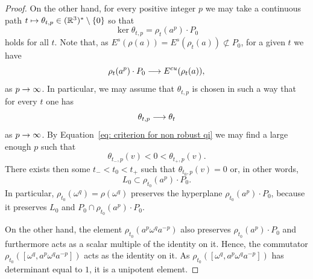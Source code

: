 \documentclass[10pt,a4paper]{amsart}
\newcommand{\R}{\mathbb{R}}
\newcommand{\RR}{\R}
\newcommand{\Es}{E^s}
\newcommand{\Ecu}{E^{cu}}
\renewcommand*{\to}{\mathchoice{\longrightarrow}{\rightarrow}{\rightarrow}{\rightarrow}}
\let\oldmapsto\mapsto
\renewcommand*{\mapsto}{\mathchoice{\longmapsto}{\oldmapsto}{\oldmapsto}{\oldmapsto}}
\let\oldin\in
\renewcommand{\in}{\mathchoice{\oldin}{\oldin}{\,\oldin\,}{\,\oldin\,}}
\numberwithin{equation}{section}
\theoremstyle{definition}\newtheorem{defi}[theo]{Definition}
\begin{document}
\begin{proof}
On the other hand, for every positive integer $p$ we may take a continuous path $t\mapsto\theta_{t,p}\in(\RR^3)^*\setminus\{0\}$ so that
\[
\ker\theta_{t,p}=\rho_t(a^p)\cdot P_0
\]
holds for all $t$.
Note that, as $\Es(\rho(a))=\Es(\rho_t(a))\not\subset P_0$, for a given $t$ we have
\[
\rho_t(a^p)\cdot P_0\to\Ecu(\rho_t(a)),
\]
as $p\to\infty$.
In particular, we may assume that $\theta_{t,p}$ is chosen in such a way that for every $t$ one has
\[
\theta_{t,p}\to\theta_t
\]
as $p\to\infty$.
By Equation~\eqref{eq: criterion for non robust qi} we may find a large enough $p$ such that
\[
\theta_{t_-,p}(v)<0<\theta_{t_+,p}(v).
\]
There exists then some $t_-<t_0<t_+$ such that $\theta_{t_0,p}(v)=0$ or, in other words,
\[
L_0\subset \rho_{t_0}(a^{p})\cdot P_0.
\]
In particular, $\rho_{t_0}(\omega^q)=\rho(\omega^q)$ preserves the hyperplane $\rho_{t_0}(a^{p})\cdot P_0$, because it preserves $L_0$ and $P_0\cap\rho_{t_0}(a^{p})\cdot P_0$.

On the other hand, the element $\rho_{t_0}(a^p\omega^q a^{-p})$ also preserves $\rho_{t_0}(a^{p})\cdot P_0$ and furthermore acts as a scalar multiple of the identity on it. Hence, the commutator $\rho_{t_0}([\omega^q,a^p\omega^q a^{-p}])$ acts as the identity on it. As $ \rho_{t_0}([\omega^q,a^p\omega^q a^{-p}]) $ has determinant equal to $1$, it is a unipotent element.
\end{proof}
\end{document}
